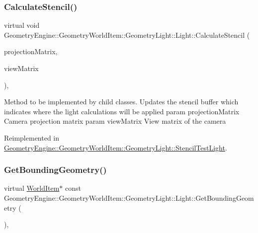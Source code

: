 \subsubsection{\texorpdfstring{CalculateStencil()}{CalculateStencil()}}
{\footnotesize\ttfamily virtual void Geometry\+Engine\+::\+Geometry\+World\+Item\+::\+Geometry\+Light\+::\+Light\+::\+Calculate\+Stencil (\begin{DoxyParamCaption}\item[{const Q\+Matrix4x4 \&}]{projection\+Matrix,  }\item[{const Q\+Matrix4x4 \&}]{view\+Matrix }\end{DoxyParamCaption})\hspace{0.3cm}{\ttfamily [inline]}, {\ttfamily [virtual]}}

Method to be implemented by child classes. Updates the stencil buffer which indicates where the light calculations will be applied param projection\+Matrix Camera projection matrix param view\+Matrix View matrix of the camera 

Reimplemented in \mbox{\hyperlink{class_geometry_engine_1_1_geometry_world_item_1_1_geometry_light_1_1_stencil_test_light_aa1d9d4bf4f47e6e55dbb1706a7e28697}{Geometry\+Engine\+::\+Geometry\+World\+Item\+::\+Geometry\+Light\+::\+Stencil\+Test\+Light}}.

\mbox{\label{class_geometry_engine_1_1_geometry_world_item_1_1_geometry_light_1_1_light_a53cc9a8e7ab6eab9d34f1655ef33eaef}} 
\subsubsection{\texorpdfstring{GetBoundingGeometry()}{GetBoundingGeometry()}}
{\footnotesize\ttfamily virtual \mbox{\hyperlink{class_geometry_engine_1_1_geometry_world_item_1_1_world_item}{World\+Item}}$\ast$ const Geometry\+Engine\+::\+Geometry\+World\+Item\+::\+Geometry\+Light\+::\+Light\+::\+Get\+Bounding\+Geometry (\begin{DoxyParamCaption}{ }\end{DoxyParamCaption})\hspace{0.3cm}{\ttfamily [inline]}, {\ttfamily [virtual]}}

